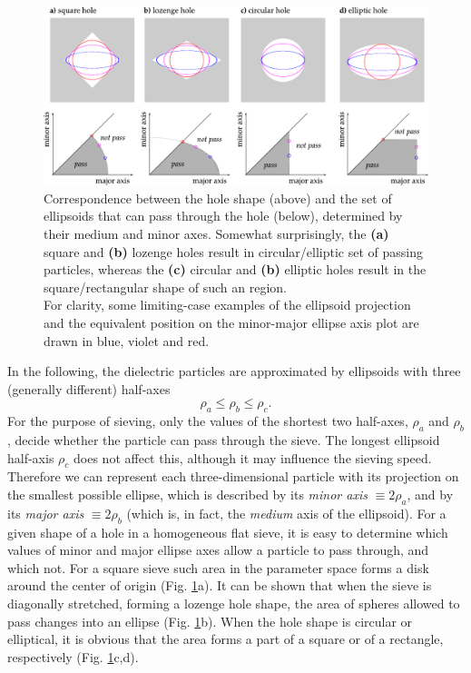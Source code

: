 \begin{figure}[ht] \caption{Correspondence between the hole shape (above) and the set of ellipsoids that can pass through the hole (below), determined by their medium and minor axes. Somewhat surprisingly, the \textbf{(a)} square and \textbf{(b)} lozenge holes result in circular/elliptic set of passing particles, whereas the \textbf{(c)} circular and \textbf{(b)} elliptic holes result in the square/rectangular shape of such an region.\\
For clarity, some limiting-case examples of the ellipsoid projection and the equivalent position on the minor-major ellipse axis plot are drawn in blue, violet and red. } \label{fg_sieve_pass_notpass} \centering 
\includegraphics[width=\textwidth]{img/technology/sieve_pass_notpass.pdf}
\end{figure}
In the following, the dielectric particles are approximated by ellipsoids with three (generally different) half-axes $$\rho_a \leq \rho_b \leq \rho_c.$$ For the purpose of sieving, only the values of the shortest two half-axes, $\rho_a$ and $\rho_b$, decide whether the particle can pass through the sieve. The longest ellipsoid half-axis $\rho_c$ does not affect this, although it may influence the sieving speed. Therefore we can represent each three-dimensional particle with its projection on the smallest possible ellipse, which is described by its \textit{minor axis} $\equiv 2\rho_a$, and by its \textit{major axis} $\equiv 2\rho_b$ (which is, in fact, the \textit{medium} axis of the ellipsoid). For a given shape of a hole in a homogeneous flat sieve, it is easy to determine which values of minor and major ellipse axes allow a particle to pass through, and which not. For a square sieve such area in the parameter space forms a disk around the center of origin (Fig. \ref{fg_sieve_pass_notpass}a). It can be shown that when the sieve is diagonally stretched, forming a lozenge hole shape, the area of spheres allowed to pass changes into an ellipse (Fig. \ref{fg_sieve_pass_notpass}b). When the hole shape is circular or elliptical, it is obvious that the area forms a part of a square or of a rectangle, respectively  (Fig. \ref{fg_sieve_pass_notpass}c,d).

